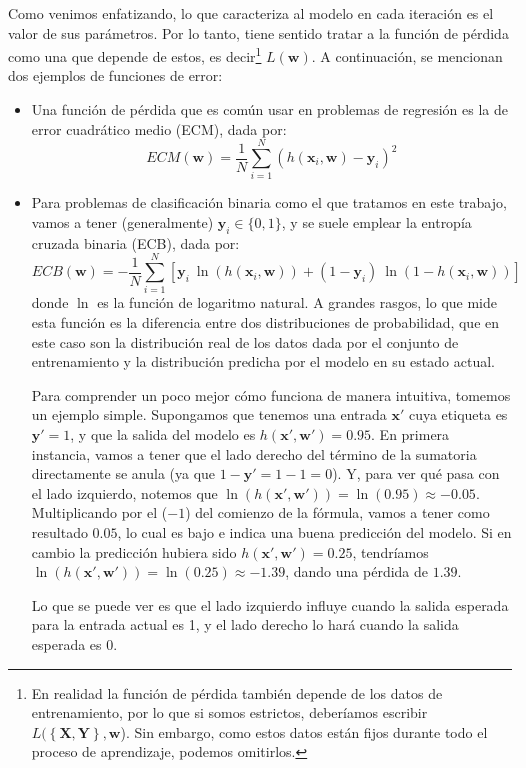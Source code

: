 \documentclass[../../main.tex]{subfiles}
\begin{document}
Como venimos enfatizando, lo que caracteriza al modelo en cada iteración es el valor de
sus parámetros. Por lo tanto, tiene sentido tratar a la función de pérdida como una que
depende de estos, es decir\footnote{En realidad la función de pérdida también depende de
los datos de entrenamiento, por lo que si somos estrictos, deberíamos escribir
\(L(\left\{\bm{X}, \bm{Y}\right\}, \bm{w}\)). Sin embargo, como estos datos están fijos
durante todo el proceso de aprendizaje, podemos omitirlos.} \(L(\bm{w})\). A continuación,
se mencionan dos ejemplos de funciones de error:
\begin{itemize}
    \item Una función de pérdida que es común usar en problemas de regresión es la de
    error cuadrático medio (ECM), dada por:
    \[
    ECM(\bm{w}) = \frac{1}{N} \sum_{i=1}^{N} \left(h(\bm{x}_i, \bm{w}) - \bm{y}_i\right)^2
    \]
    \item Para problemas de clasificación binaria como el que tratamos en este trabajo, vamos a tener
    (generalmente) \(\bm{y}_i \in \{0,1\}\), y se suele emplear la entropía cruzada binaria (ECB), dada por:
    \[
    ECB(\bm{w}) = -\frac{1}{N} \sum_{i=1}^{N}
        \left[
            \bm{y}_i\ \ln(h(\bm{x}_i, \bm{w})) + (1 - \bm{y}_i)\ \ln(1 - h(\bm{x}_i, \bm{w}))
        \right]
    \]
    donde \(\ln\) es la función de logaritmo natural. A grandes rasgos, lo que mide esta
    función es la diferencia entre dos distribuciones de probabilidad, que en este caso
    son la distribución real de los datos dada por el conjunto de entrenamiento y la
    distribución predicha por el modelo en su estado actual.

    Para comprender un poco mejor cómo funciona de manera intuitiva, tomemos un ejemplo
    simple. Supongamos que tenemos una entrada \(\bm{x}'\) cuya etiqueta es \(\bm{y}'=1\),
    y que la salida del modelo es \(h(\bm{x}', \bm{w}') = 0{.}95\). En primera instancia,
    vamos a tener que el lado derecho del término de la sumatoria directamente se anula
    (ya que \(1-\bm{y}' = 1-1 = 0\)). Y, para ver qué pasa con el lado izquierdo, notemos
    que \(\ln(h(\bm{x}', \bm{w}')) = \ln(0{.}95) \approx -0{.}05\). Multiplicando por el
    (\(-1\)) del comienzo de la fórmula, vamos a tener como resultado \(0{.}05\), lo cual
    es bajo e indica una buena predicción del modelo. Si en cambio la predicción hubiera
    sido \(h(\bm{x}', \bm{w}') = 0{.}25\), tendríamos \(\ln(h(\bm{x}', \bm{w}')) =
    \ln(0{.}25) \approx -1{.}39\), dando una pérdida de \(1{.}39\).

    Lo que se puede ver es que el lado izquierdo influye cuando la salida esperada para la
    entrada actual es 1, y el lado derecho lo hará cuando la salida esperada es 0.
\end{itemize}
\end{document}
